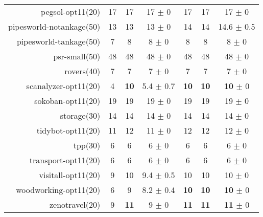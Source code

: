 \begin{center}
\begin{tabular}{|r|*{2}{ccc|}}
pegsol-opt11(20) & 17 & 17 & 17 $\pm$ 0 & 17 & 17 & 17 $\pm$ 0\\
pipesworld-notankage(50) & 13 & 13 & 13 $\pm$ 0 & 14 & 14 & 14.6 $\pm$ 0.5\\
pipesworld-tankage(50) & 7 & 8 & 8 $\pm$ 0 & 8 & 8 & 8 $\pm$ 0\\
psr-small(50) & 48 & 48 & 48 $\pm$ 0 & 48 & 48 & 48 $\pm$ 0\\
rovers(40) & 7 & 7 & 7 $\pm$ 0 & 7 & 7 & 7 $\pm$ 0\\
scanalyzer-opt11(20) & 4 & \textbf{10} & 5.4 $\pm$ 0.7 & \textbf{10} & \textbf{10} & \textbf{10} $\pm$ 0\\
sokoban-opt11(20) & 19 & 19 & 19 $\pm$ 0 & 19 & 19 & 19 $\pm$ 0\\
storage(30) & 14 & 14 & 14 $\pm$ 0 & 14 & 14 & 14 $\pm$ 0\\
tidybot-opt11(20) & 11 & 12 & 11 $\pm$ 0 & 12 & 12 & 12 $\pm$ 0\\
tpp(30) & 6 & 6 & 6 $\pm$ 0 & 6 & 6 & 6 $\pm$ 0\\
transport-opt11(20) & 6 & 6 & 6 $\pm$ 0 & 6 & 6 & 6 $\pm$ 0\\
visitall-opt11(20) & 9 & 10 & 9.4 $\pm$ 0.5 & 10 & 10 & 10 $\pm$ 0\\
woodworking-opt11(20) & 6 & 9 & 8.2 $\pm$ 0.4 & \textbf{10} & \textbf{10} & \textbf{10} $\pm$ 0\\
zenotravel(20) & 9 & \textbf{11} & 9 $\pm$ 0 & \textbf{11} & \textbf{11} & \textbf{11} $\pm$ 0\\
\end{tabular}
\end{center}
